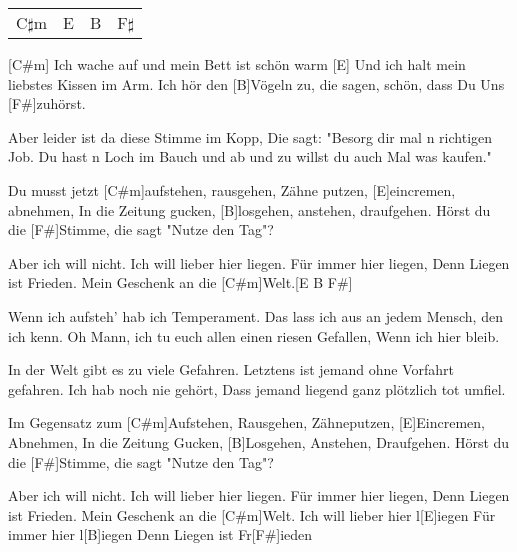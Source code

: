 

\begin{guitar}
	{\footnotesize\begin{tabular}{|l|l|l|l|}
			C$\sharp$m & E & B & F$\sharp$
	\end{tabular} }
	
	[C#m] Ich wache auf und mein Bett ist schön warm
	[E] Und ich halt mein liebstes Kissen im Arm.
	Ich hör den [B]Vögeln zu, die sagen, schön, dass Du
	Uns [F#]zuhörst.

	Aber leider ist da diese Stimme im Kopp,
	Die sagt: "Besorg dir mal n richtigen Job.
	Du hast n Loch im Bauch und ab und zu willst du auch
	Mal was kaufen."
	
	\begin{highlightbar}
		Du musst jetzt [C#m]aufstehen, rausgehen,
		Zähne putzen, [E]eincremen, abnehmen,
		In die Zeitung gucken, [B]losgehen, anstehen, draufgehen.
		Hörst du die [F#]Stimme, die sagt "Nutze den Tag"?
		
		Aber ich will nicht.
		Ich will lieber hier liegen.
		Für immer hier liegen,
		Denn Liegen ist Frieden.
		Mein Geschenk an die [C#m]Welt.[E B F#]{}
	\end{highlightbar}
	
	\songsection{Strophe 2}
	Wenn ich aufsteh' hab ich Temperament.
	Das lass ich aus an jedem Mensch, den ich kenn.
	Oh Mann, ich tu euch allen einen riesen Gefallen,
	Wenn ich hier bleib.
	
	In der Welt gibt es zu viele Gefahren.
	Letztens ist jemand ohne Vorfahrt gefahren.
	Ich hab noch nie gehört,
	Dass jemand liegend ganz plötzlich tot umfiel.
	\pagebreak
	\begin{highlightbar}
		\songsection{Refrain}
		Im Gegensatz zum [C#m]Aufstehen, Rausgehen,
		Zähneputzen, [E]Eincremen, Abnehmen,
		In die Zeitung Gucken, [B]Losgehen, Anstehen, Draufgehen.
		Hörst du die [F#]Stimme, die sagt "Nutze den Tag"?
		
		Aber ich will nicht.
		Ich will lieber hier liegen.
		Für immer hier liegen,
		Denn Liegen ist Frieden.
		Mein Geschenk an die [C#m]Welt.
		Ich will lieber hier l[E]iegen
		Für immer hier l[B]iegen
		Denn Liegen ist Fr[F#]ieden
		

\end{highlightbar}
\end{guitar}
